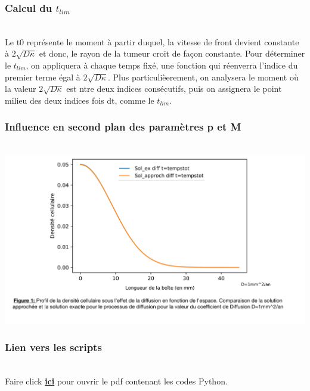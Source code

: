\documentclass[12pt,a4paper]{article}
\begin{document}
\subsubsection{Calcul du $t_{lim}$}
\\
Le t0 représente le moment à partir duquel, la vitesse de front devient constante à $2\sqrt{D\kappa}$ et donc, le rayon de la tumeur croit de façon constante. 
Pour déterminer le $t_{lim}$, on appliquera à chaque temps fixé, une fonction qui réenverra l'indice du premier terme égal à $2\sqrt{D\kappa}$. Plus particulièerement, on analysera le moment où la valeur $2\sqrt{D\kappa}$ est ntre deux indices consécutifs, puis on assignera le point milieu des deux indices fois dt, comme le $t_{lim}$. 
\\
\subsubsection{Influence en second plan des paramètres p et M}
\\
\includegraphics[page=8,scale=0.25]{FIGURES.pdf}

\subsubsection{Lien vers les scripts}
\\
Faire click \href{run:Stage 2021/suite rapport/CodesPython.tex}{\textbf{ici}} pour ouvrir le pdf contenant les codes Python.
\end{document}
